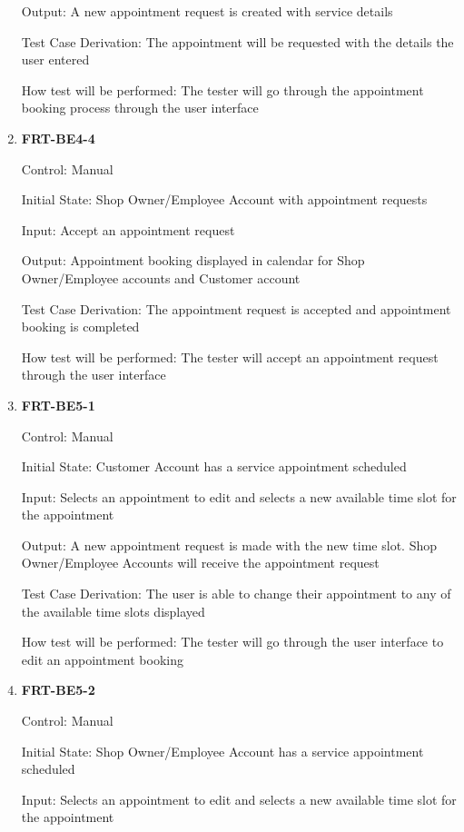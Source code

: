 \documentclass[12pt, titlepage]{article}
\begin{document}
\begin{enumerate}
	      Output: A new appointment request is created with service details

	      Test Case Derivation: The appointment will be requested with the details the user entered

	      How test will be performed: The tester will go through the appointment booking process through the
	      user interface

	\item \textbf{FRT-BE4-4}

	      Control: Manual

	      Initial State: Shop Owner/Employee Account with appointment requests

	      Input: Accept an appointment request

	      Output: Appointment booking displayed in calendar for Shop Owner/Employee accounts and Customer
	      account

	      Test Case Derivation: The appointment request is accepted and appointment booking is completed

	      How test will be performed: The tester will accept an appointment request through the user
	      interface

	\item \textbf{FRT-BE5-1}

	      Control: Manual

	      Initial State: Customer Account has a service appointment scheduled

	      Input: Selects an appointment to edit and selects a new available time slot for the appointment

	      Output: A new appointment request is made with the new time slot. Shop Owner/Employee Accounts will
	      receive the appointment request

	      Test Case Derivation: The user is able to change their appointment to any of the available time
	      slots displayed

	      How test will be performed: The tester will go through the user interface to edit an appointment
	      booking

	\item \textbf{FRT-BE5-2}

	      Control: Manual

	      Initial State: Shop Owner/Employee Account has a service appointment scheduled

	      Input: Selects an appointment to edit and selects a new available time slot for the appointment


\end{enumerate}
\end{document}
